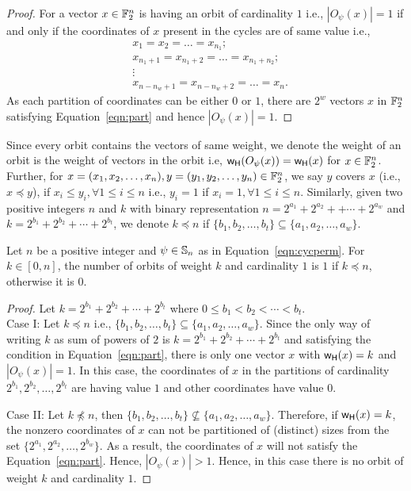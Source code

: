 \documentclass{llncs}
\begin{document}
\begin{proof}
For a vector $x \in \mathbb{F}_2^n$ is having an orbit of cardinality $1$ i.e., $|O_\psi(x)| = 1$ if and only if the coordinates of $x$ present in the cycles are of same value i.e., 
\begin{align}\label{eqn:part}
 & x_1  = x_2 = \ldots = x_{n_1}; \nonumber\\
 & x_{n_1+1}  = x_{n_1+2} = \ldots = x_{n_1+n_2}; \nonumber\\
& \vdots \\
 & x_{n-n_w+1}  = x_{n-n_w+2} = \ldots = x_n. \nonumber
\end{align}
As each partition of coordinates can be either $0$ or $1$, there are $2^w$ vectors $x$ in $\mathbb{F}_2^n$ satisfying Equation~\ref{eqn:part} and hence $|O_\psi(x)| = 1$.
\end{proof}

Since every orbit contains the vectors of same weight, we denote the weight of an orbit is the weight of vectors in the orbit i.e, $\mathsf{w_H}(O_\psi(x)) = \mathsf{w_H}(x)$ for $x \in \mathbb{F}_2^n$. Further, for $x = (x_1, x_2,\ldots, x_n), y = (y_1, y_2, \ldots, y_n) \in \mathbb{F}_2^n$, we say $y$ covers $x$ (i.e., $x \preceq y $), if $x_{i} \leq y_{i}, \forall 1 \leq i \leq n$ i.e., $y_i = 1$ if $x_i = 1, \forall 1 \leq i \leq n$.
Similarly, given two positive integers $n$ and $k$ with binary representation $n = 2^{a_1} + 2^{a_2} + + \cdots + 2^{a_w}$ and $k = 2^{b_1}+ 2^{b_2} + \cdots + 2^{b_t}$, we denote $k \preceq n$ if $\{b_1, b_2, \ldots, b_t\} \subseteq \{a_1, a_2, \ldots, a_w\}$.
\begin{lemma}
Let $n$ be a positive integer and $\psi \in \mathbb{S}_n$ as in Equation~\ref{eqn:cycperm}. For $k \in [0,n]$, the number of orbits of weight $k$ and cardinality $1$ is $1$ if $k \preceq n$, otherwise it is $0$.
\end{lemma}
\begin{proof}
Let $k = 2^{b_1}+ 2^{b_2} + \cdots + 2^{b_t}$ where $0 \leq b_1 < b_2 < \cdots < b_t$.\\
Case I: Let $k \preceq n$ i.e., $\{b_1, b_2, \ldots, b_t\} \subseteq \{a_1, a_2, \ldots, a_w\}$. Since the only way of writing $k$ as sum of powers of $2$ is $k = 2^{b_1}+ 2^{b_2} + \cdots + 2^{b_t}$ and satisfying the condition in Equation~\ref{eqn:part}, there is only one vector $x$ with $\mathsf{w_H}(x) = k$ and $|O_\psi(x)| = 1$. In this case, the coordinates of $x$ in the partitions of cardinality $2^{b_1}, 2^{b_2}, \ldots, 2^{b_t}$ are having value $1$ and other coordinates have value $0$.

\noindent Case II: Let $k \not\preceq n$, then $\{b_1, b_2, \ldots, b_t\} \not \subseteq \{a_1, a_2, \ldots, a_w\}$. Therefore, if $\mathsf{w_H}(x) = k$, the nonzero coordinates of $x$ can not be partitioned of (distinct) sizes from the set $\{2^{a_1}, 2^{a_2}, \ldots, 2^{b_w}\}$.
As a result, the coordinates of $x$ will not satisfy the Equation~\ref{eqn:part}. Hence,
$|O_\psi(x)| > 1$. Hence, in this case there is no orbit of weight $k$ and cardinality $1$.
\end{proof}
\end{document}
